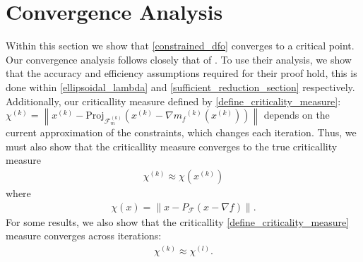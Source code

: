 \documentclass{article}
\theoremstyle{case}
\numberwithin{theorem}{subsection}
\newcommand{\chik}{{\chi^{(k)}}}
\newcommand{\chil}{{\chi^{(l)}}}
\newcommand{\feasiblek}{{\mathcal F_m^{(k)}}}
\newcommand{\feasible}{{\mathcal F}}
\newcommand{\gradf}{\nabla f}
\newcommand{\mfk}{{{m}_f}^{(k)}}
\newcommand{\xk}{x^{(k)}}
\begin{document}
\section{Convergence Analysis}
\label{convergence_discussion}
Within this section we show that \cref{constrained_dfo} converges to a critical point.
Our convergence analysis follows closely that of \cite{Conejo:2013:GCT:2620806.2621814}.
To use their analysis, we show that the accuracy and efficiency assumptions required for their proof hold, 
this is done within \cref{ellipsoidal_lambda} and \cref{sufficient_reduction_section} respectively.
Additionally, our criticallity measure defined by \cref{define_criticality_measure}:
$\chik = \left\|\xk - \text{Proj}_{\feasiblek}\left(\xk- \nabla \mfk\left(\xk\right)\right)\right\|$
depends on the current approximation of the constraints, which changes each iteration.
Thus, we must also show that the criticallity measure converges to the true criticallity measure
\begin{align}
\label{verbiage_hoffman_use_one}
\chik \approx \chi (\xk)
\end{align}
where 
\begin{align*}
\chi (x) = \left \| x - P_{\feasible}\left( x - \gradf\right) \right \|.
\end{align*}
For some results, we also show that the criticallity \cref{define_criticality_measure} measure converges across iterations:
\begin{align}
\label{verbiage_hoffman_use_two}
\chik \approx \chil.
\end{align}
\end{document}
